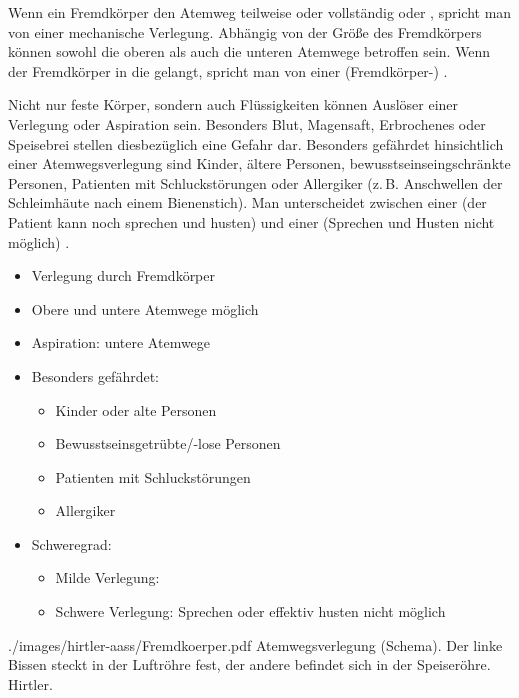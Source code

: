 {%
%
Wenn ein Fremdkörper den Atemweg teilweise oder vollständig 
 oder , spricht man von einer
mechanische Verlegung. Abhängig von der Größe des
Fremdkörpers können sowohl die oberen als auch die unteren
Atemwege betroffen sein. Wenn der Fremdkörper in die
 gelangt, spricht man von einer
(Fremdkörper-) .

Nicht nur feste Körper, sondern auch Flüssigkeiten können
Auslöser einer Verlegung oder Aspiration sein. Besonders
Blut, Magensaft, Erbrochenes oder Speisebrei stellen
diesbezüglich eine Gefahr dar.
Besonders gefährdet hinsichtlich einer Atemwegsverlegung sind
Kinder, ältere Personen, bewusstseinseingschränkte Personen,
Patienten mit Schluckstörungen oder Allergiker (z.\,B.
Anschwellen der Schleimhäute nach einem Bienenstich).
Man unterscheidet zwischen einer  (der Patient
kann noch sprechen und husten) und einer
 (Sprechen und Husten nicht
möglich) \citep{Erc2005Sec2,Erc2005Sec6,Erc2005DeSec2,Erc2005DeSec6}.



}
{%
\begin{itemize}
  \item Verlegung durch Fremdkörper
  \item Obere und untere Atemwege möglich
  \item Aspiration: untere Atemwege
  \item Besonders gefährdet:
  \begin{itemize}
    \item Kinder oder alte Personen
    \item Bewusstseinsgetrübte/-lose Personen
    \item Patienten mit Schluckstörungen
    \item Allergiker
  \end{itemize}
  \item Schweregrad:
  \begin{itemize}
    \item Milde Verlegung: 
    \item Schwere Verlegung: Sprechen oder
    effektiv husten nicht möglich
  \end{itemize}
\end{itemize}
}
{./images/hirtler-aass/Fremdkoerper.pdf}
{Atemwegsverlegung (Schema). Der linke Bissen steckt in der Luftröhre fest, der
andere befindet sich in der Speiseröhre.}
{Hirtler.}




